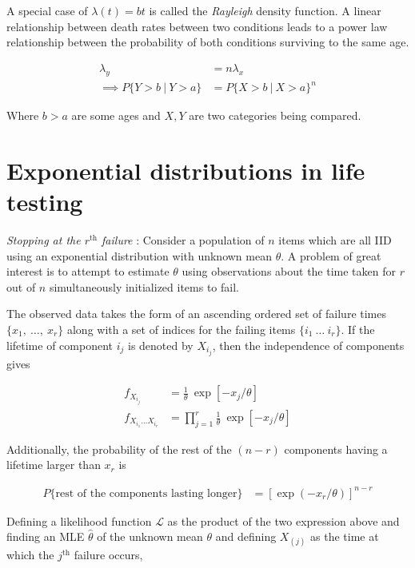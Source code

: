 A special case of $ \lambda(t) = bt $ is called the \textit{Rayleigh} density function. A linear relationship between death rates between two conditions leads to a power law relationship between the probability of both conditions surviving to the same age.

\begin{align}
	\lambda_y &= n\lambda_x \nonumber \nonumber\\
	\implies P\{ Y > b\ |\ Y > a \} &= P\{ X > b\ |\ X > a \}^{n} 
\end{align}

Where $ b > a $ are some ages and $ X, Y $ are two categories being compared.

\section{Exponential distributions in life testing}

\textit{Stopping at the $ r^{\text{th}} $ failure} : Consider a population of $ n $ items which are all IID using an exponential distribution with unknown mean $ \theta $. A problem of great interest is to attempt to estimate $ \theta $ using observations about the time taken for $ r $ out of $ n $ simultaneously initialized items to fail.

The observed data takes the form of an ascending ordered set of failure times $ \{ x_1,\ \dots,\ x_r \} $ along with a set of indices for the failing items $\{ i_1\ \dots \ i_r \}$. If the lifetime of component $i_j$ is denoted by $X_{i_{j}}$, then the independence of components gives

\begin{align}
	f_{X_{i_j}} &= \frac{1}{\theta}\ \exp\left[ -x_j / \theta \right] \\
	f_{X_{i_1} \dots X_{i_r}} &=  \prod\limits_{j=1}^{r} \frac{1}{\theta}\ \exp\left[ -x_j / \theta \right]
\end{align}

Additionally, the probability of the rest of the $(n-r)$ components having a lifetime larger than $x_r$ is

\begin{align}
	P\{ \text{rest of the components lasting longer} \} &= \left[ \exp(-x_r/\theta) \right]^{n-r}
\end{align}

Defining a likelihood function $\mathcal{L}$ as the product of the two expression above and finding an MLE $\widehat{\theta}$ of the unknown mean $\theta$ and defining $X_{(j)}$ as the time at which the $j^{\text{th}}$ failure occurs,


